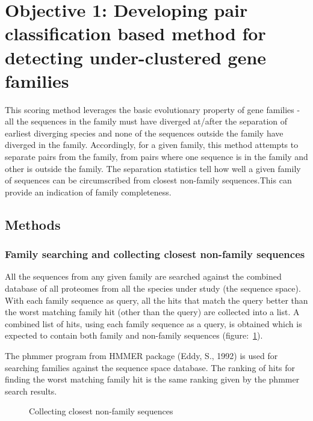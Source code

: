 \documentclass{article}
\begin{document}
	\section{Objective 1: Developing pair classification based method for detecting under-clustered gene families} 
	This scoring method leverages the basic evolutionary property of gene families - all the sequences in the family must have diverged at/after the separation of earliest diverging species and none of the sequences outside the family have diverged in the family. Accordingly, for a given family, this method attempts to separate pairs from the family, from pairs where one sequence is in the family and other is outside the family. The separation statistics tell how well a given family of sequences can be circumscribed from closest non-family sequences.This can provide an indication of family completeness.
		\subsection{Methods}
			\subsubsection{Family searching and collecting closest non-family sequences}
			All the sequences from any given family are searched against the combined database of all proteomes from all the species under study (the sequence space). With each family sequence as query, all the hits that match the query better than the worst matching family hit (other than the query) are collected into a list. A combined list of hits, using each family sequence as a query, is obtained which is expected to contain both family and non-family sequences (figure:~\ref{fig:collecting_non_fam_seqs}).
			
			The phmmer program from HMMER package (Eddy, S., 1992) is used for searching families against the sequence space database. The ranking of hits for finding the worst matching family hit is the same ranking given by the phmmer search results. 
			\begin{figure}
				\caption{Collecting closest non-family sequences}
				\label{fig:collecting_non_fam_seqs}
			\end{figure}
			
\end{document}
